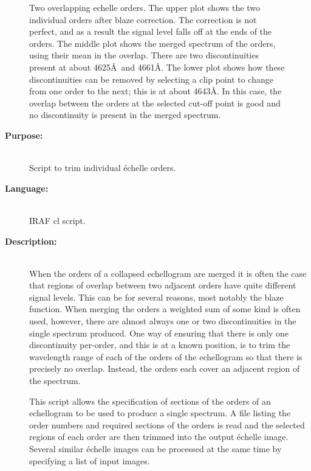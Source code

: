 \documentclass[twoside,11pt]{article}
\begin{document}
\begin{figure}[h]
\begin{center}
\parbox{140mm}{
\caption{Two overlapping echelle orders.  The upper plot shows the two
individual orders after blaze correction.  The correction is not perfect,
and as a result the signal level falls off at the ends of the orders.
The middle plot shows the merged spectrum of the orders, using their mean in
the overlap.  There are two discontinuities present at about 4625\AA\ and
4661\AA .  The lower plot shows how these discontinuities can be removed by
selecting a clip point to change from one order to the next; this is at about
4643\AA .  In this case, the overlap between the orders at the selected
cut-off point is good and no discontinuity is present in the merged
spectrum.
}
}
\end{center}
\label{fi_ech_trim1}
\end{figure}

\begin{description}

\item [{\bf Purpose:}] \mbox{} \\
     Script to trim individual \'{e}chelle orders.

\item [{\bf Language:}] \mbox{} \\
     IRAF cl script.

\item [{\bf Description:}] \mbox{} \\
     When the orders of a collapsed echellogram are merged it is
     often the case that regions of overlap between two adjacent
     orders have quite different signal levels.  This can be for
     several reasons, most notably the blaze function.  When merging
     the orders a weighted sum of some kind is often used, however,
     there are almost always one or two discontinuities in the single
     spectrum produced.  One way of ensuring that there is only one
     discontinuity per-order, and this is at a known position, is
     to trim the wavelength range of each of the orders of the
     echellogram so that there is precisely no overlap.  Instead,
     the orders each cover an adjacent region of the spectrum.

     This script allows the specification of sections of the orders
     of an echellogram to be used to produce a single spectrum.
     A file listing the order numbers and required sections of the
     orders is read and the selected regions of each order are then
     trimmed into the output \'{e}chelle image.  Several similar \'{e}chelle
     images can be processed at the same time by specifying a list
     of input images.


\end{description}
\end{document}
